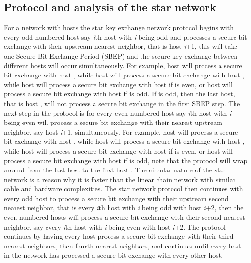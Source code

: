 \documentclass[a4paper,12pt,pdftex]{article}
\begin{document}
\subsection{Protocol and analysis of the star network}

For a network with  hosts the star key exchange network protocol begins with every odd numbered host say \textit{i}th host with \textit{i} being odd and processes a secure bit exchange with their upstream nearest neighbor, that is host \textit{i}+1, this will take one Secure Bit Exchange Period (SBEP) and the secure key exchange between different hosts will occur simultaneously. For example, host  will process a secure bit exchange with host , while host  will process a secure bit exchange with host , while host  will process a secure bit exchange with host  if  is even, or host  will process a secure bit exchange with host  if  is odd. If  is odd, then the last host, that is host , will not process a secure bit exchange in the first SBEP step. The next step in the protocol is for every even numbered host say \textit{i}th host with \textit{i} being even will process a secure bit exchange with their nearest upstream neighbor, say host \textit{i}+1, simultaneously. For example, host  will process a secure bit exchange with host , while host  will process a secure bit exchange with host , while host  will process a secure bit exchange with host  if  is even, or host  will process a secure bit exchange with host  if  is odd, note that the protocol will wrap around from the last host  to the first host . The circular nature of the star network is a reason why it is faster than the linear chain network with similar cable and hardware complexities. The star network protocol  then continues with every odd host to process a secure bit exchange with their upstream second nearest neighbor, that is every \textit{i}th host with \textit{i} being odd with host \textit{i}+2, then the even numbered hosts will process a secure bit exchange with their second nearest neighbor, say every \textit{i}th host with \textit{i} being even with host \textit{i}+2. The protocol continues by having every host process a secure bit exchange with their third nearest neighbors, then fourth nearest neighbors, and continues until every host in the network has processed a secure bit exchange with every other host.
\end{document}
